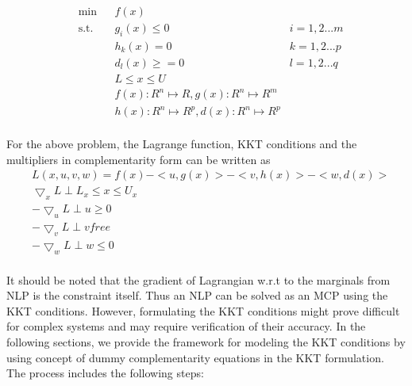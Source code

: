 \documentclass{article}
\begin{document}
\begin{equation}
\begin{aligned}
&	\min
& & f(x) \\
& \text{s.t.} & & 	 g_{i}(x) \leqslant 0	&	i = 1,2...m \\
& & &			h_{k}(x) = 0	 &	k = 1,2...p \\
& & &			d_{l}(x) \geqslant =0		&	l = 1,2...q \\
& & &			L \leq x \leq U \\
& & &			f(x): {\!R}^n \mapsto \!R , g(x): {\!R}^n \mapsto {\!R}^m\\
& & &			h(x): {\!R}^n \mapsto {\!R}^ p , d(x): {\!R}^n \mapsto {\!R}^ p\\
\end{aligned}
\end{equation}

\noindent For the above problem, the Lagrange function, KKT conditions and the multipliers in complementarity form can be written as \\

\begin{equation}
\begin{aligned}
& L(x,u,v,w) = f(x) - <u,g(x)> - <v,h(x)> - <w,d(x)>  \\
& \bigtriangledown_x L  \perp L_x \leq x \leq U_x 	\\
& - \bigtriangledown_u L  \perp u \geq 0	\\
& -\bigtriangledown_v L  \perp v free	\\
& -\bigtriangledown_w L  \perp w \leq 0	\\
\end{aligned}
\end{equation}

\noindent It should be noted that the gradient of Lagrangian w.r.t to the marginals from NLP is the constraint itself. Thus an NLP can be solved as an MCP
using the KKT conditions. However, formulating the KKT conditions might prove difficult for complex systems and may require verification of their accuracy.
In the following sections, we provide the framework for modeling the KKT conditions by using concept of dummy complementarity equations in the KKT formulation.
The process includes the following steps:
\end{document}
